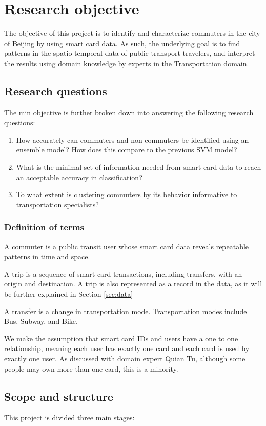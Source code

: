\documentclass{article}
\begin{document}
\newpage
\section{Research objective}
The objective of this project is to identify and characterize commuters in the city of Beijing by using smart card data. As such, the underlying goal is to find patterns in the spatio-temporal data of public transport travelers, and interpret the results using domain knowledge by experts in the Transportation domain.  

\subsection{Research questions}
The min objective is further broken down into answering the following research questions: 

\begin{enumerate}
\item How accurately can commuters and non-commuters be identified using an ensemble model? How does this compare to the previous SVM model?
\item What is the minimal set of information needed from smart card data to reach an acceptable accuracy in classification?
\item To what extent is clustering commuters by its behavior informative to transportation specialists? 
\end{enumerate}

\subsubsection{Definition of terms}
A commuter is a public transit user whose smart card data reveals repeatable patterns in time and space.

A trip is a sequence of smart card transactions, including transfers, with an origin and destination. A trip is also represented as a record in the data, as it will be further explained in Section \ref{sec:data}

A transfer is a change in transportation mode. Transportation modes include Bus, Subway, and Bike. 

We make the assumption that smart card IDs and users have a one to one relationship, meaning each user has exactly one card and each card is used by exactly one user. As discussed with domain expert Quian Tu, although some people may own more than one card, this is a minority.

\subsection{Scope and structure}
This project is divided three main stages: 
\end{document}
